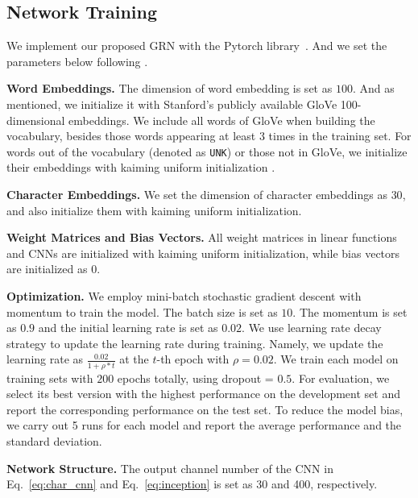 \documentclass[letterpaper]{article} \usepackage{aaai19}  \usepackage{times}  \usepackage{helvet}  \usepackage{courier}  \usepackage{url}  \usepackage{graphicx}  \usepackage{amsmath}
\newcommand{\GRN}{GRN}
\begin{document}
\subsection{Network Training}
We implement our proposed \GRN{} with the Pytorch library~\cite{paszke2017automatic}. And we set the parameters below following \cite{ma2016CNNBLSTMCRF}.

\textbf{Word Embeddings.} The dimension of word embedding is set as $100$. And as mentioned, we initialize it with Stanford's publicly available GloVe 100-dimensional embeddings. We include all words of GloVe when building the vocabulary, besides those words appearing at least $3$ times in the training set. For words out of the vocabulary (denoted as \texttt{UNK}) or those not in GloVe, we initialize their embeddings with kaiming uniform initialization \cite{he2015delving}. 

\textbf{Character Embeddings.} We set the dimension of character embeddings as $30$, and also initialize them with kaiming uniform initialization.

\textbf{Weight Matrices and Bias Vectors.} All weight matrices in linear functions and CNNs are initialized with kaiming uniform initialization, while bias vectors are initialized as $0$.

\textbf{Optimization.} We employ mini-batch stochastic gradient descent with momentum to train the model. The batch size is set as $10$. The momentum is set as $0.9$ and the initial learning rate is set as $0.02$. We use learning rate decay strategy to update the learning rate during training. Namely, we update the learning rate as $\frac{0.02}{1+\rho*t}$ at the $t$-th epoch with $\rho=0.02$. We train each model on training sets with $200$ epochs totally, using dropout = $0.5$. For evaluation, we select its best version with the highest performance on the development set and report the corresponding performance on the test set. To reduce the model bias, we carry out 5 runs for each model and report the average performance and the standard deviation.

\textbf{Network Structure.} The output channel number of the CNN in Eq.~\ref{eq:char_cnn} and Eq.~\ref{eq:inception} is set as 30 and 400, respectively.
\end{document}
